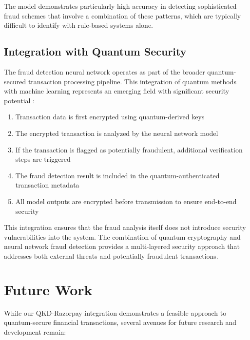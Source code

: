 \documentclass[onecolumn,a4paper,10pt]{IEEEtran}
\begin{document}
The model demonstrates particularly high accuracy in detecting sophisticated fraud schemes that involve a combination of these patterns, which are typically difficult to identify with rule-based systems alone.

\subsection{Integration with Quantum Security}

The fraud detection neural network operates as part of the broader quantum-secured transaction processing pipeline. This integration of quantum methods with machine learning represents an emerging field with significant security potential \cite{quantum_ml}:

\begin{enumerate}
    \item Transaction data is first encrypted using quantum-derived keys
    \item The encrypted transaction is analyzed by the neural network model
    \item If the transaction is flagged as potentially fraudulent, additional verification steps are triggered
    \item The fraud detection result is included in the quantum-authenticated transaction metadata
    \item All model outputs are encrypted before transmission to ensure end-to-end security
\end{enumerate}

This integration ensures that the fraud analysis itself does not introduce security vulnerabilities into the system. The combination of quantum cryptography and neural network fraud detection provides a multi-layered security approach that addresses both external threats and potentially fraudulent transactions.

\section{Future Work}
\setcounter{figure}{0}
\setcounter{table}{0}

While our QKD-Razorpay integration demonstrates a feasible approach to quantum-secure financial transactions, several avenues for future research and development remain:
\end{document}
